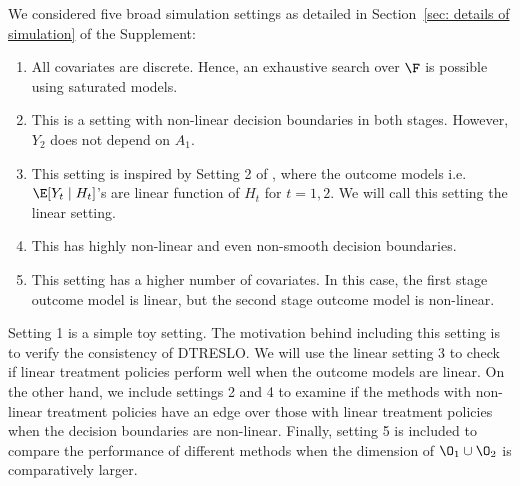 \documentclass[preprint] {imsart}
\begin{document}
We considered five broad simulation settings as detailed in Section~\ref{sec: details of simulation} of the Supplement:
\begin{enumerate}
    \item All covariates are discrete. Hence, an exhaustive search over $\F$ is possible using saturated models. 
    \item This is a setting with non-linear decision boundaries in both stages. However, $Y_2$ does not depend on $A_1$.
    \item This setting is inspired by Setting 2 of  \cite{zhao2015}, where the outcome models i.e. $\E[Y_t\mid H_t]$'s are  linear function of $H_t$ for $t=1,2$. We will call this setting the linear setting.
    \item This has highly non-linear and even non-smooth decision boundaries.
    \item This setting has a higher number of  covariates. In this case, the first stage outcome model is linear, but the second stage outcome model is non-linear.
\end{enumerate}
 Setting 1 is a simple toy setting. The motivation behind including this setting is to verify the consistency of DTRESLO. 
We will use the linear setting 3 
 to check if linear treatment policies perform well when the outcome models are linear.
 On the other hand, we include settings 2 and 4 to examine if the methods with non-linear treatment policies have an edge over those with linear treatment policies when the decision boundaries are non-linear. Finally, setting 5 is included to compare the performance of different methods when the dimension of $\O_1\cup \O_2$ is comparatively larger. 
\end{document}
